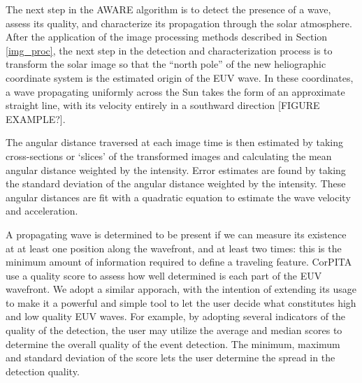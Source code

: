 The next step in the AWARE algorithm is to detect the presence of a
wave, assess its quality, and characterize its propagation through the
solar atmosphere. After the application of the image processing
methods described in Section \ref{img_proc}, the next step in the
detection and characterization process is to transform the solar image
so that the “north pole” of the new heliographic coordinate system is
the estimated origin of the EUV wave. In these coordinates, a wave
propagating uniformly across the Sun takes the form of an approximate
straight line, with its velocity entirely in a southward direction
[FIGURE EXAMPLE?].


The angular distance traversed at each image time is then estimated by
taking cross-sections or `slices' of the transformed images and
calculating the mean angular distance weighted by the intensity.
Error estimates are found by taking the standard deviation of the
angular distance weighted by the intensity. These angular distances
are fit with a quadratic equation to estimate the wave velocity and
acceleration.

A propagating wave is determined to be present if we can measure its
existence at at least one position along the wavefront, and at least
two times: this is the minimum amount of information required to
define a traveling feature.  CorPITA \citep{2014SoPh..289.3279L} use a
quality score to assess how well determined is each part of the EUV
wavefront. We adopt a similar apporach, with the intention of
extending its usage to make it a powerful and simple tool to let the
user decide what constitutes high and low quality EUV waves. For
example, by adopting several indicators of the quality of the
detection, the user may utilize the average and median scores to
determine the overall quality of the event detection.  The minimum,
maximum and standard deviation of the score lets the user determine
the spread in the detection quality.
